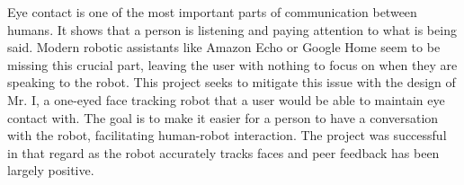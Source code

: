 Eye contact is one of the most important parts of communication between humans. It shows that a person is listening and paying attention to what is being said. Modern robotic assistants like Amazon Echo or Google Home seem to be missing this crucial part, leaving the user with nothing to focus on when they are speaking to the robot. This project seeks to mitigate this issue with the design of Mr. I, a one-eyed face tracking robot that a user would be able to maintain eye contact with. The goal is to make it easier for a person to have a conversation with the robot, facilitating human-robot interaction. The project was successful in that regard as the robot accurately tracks faces and peer feedback has been largely positive.